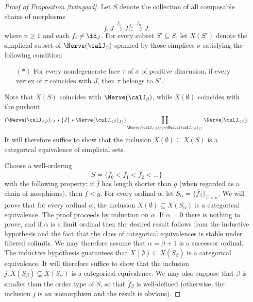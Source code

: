 \begin{Model Categories}
\begin{Didn't Read}
\begin{proof}[Proof of Proposition \ref{twingood}]
Let $S$ denote the collection of all composable chains of morphisms
$$\overline{f}: J \stackrel{ f_1}{\rightarrow} J \stackrel{ f_2} \ldots \stackrel{f_n}{\rightarrow} J.$$
where $n \geq 1$ and each $f_{i} \neq \id_{J}$. For every subset $S' \subseteq S$, let
$X(S')$ denote the simplicial subset of $\Nerve( \calJ_{\beta})$ spanned by those simplices
$\sigma$ satisfying the following condition:
\begin{itemize}
\item[$(\ast)$] For every nondegenerate face $\tau$ of $\sigma$ of positive dimension, if every
vertex of $\tau$ coincides with $J$, then $\tau$ belongs to $S'$.
\end{itemize}
Note that $X(S)$ coincides with $\Nerve( \calJ_{\beta})$, while $X( \emptyset)$ coincides with
the pushout 
$$(\Nerve (\calJ_{< \beta})_{/J} \star \{ J \} \star \Nerve (\calJ_{< \beta})_{J/})
\coprod_{ \Nerve( \calJ_{< \beta})_{/J} \star \Nerve( \calJ_{< \beta})_{J/}}
\Nerve( \calJ_{< \beta} ). $$
It will therefore suffice to show that the inclusion $X(\emptyset) \subseteq X(S)$ is a
categorical equivalence of simplicial sets.

Choose a well-ordering
$$ S = \{ \overline{f}_0 < \overline{f}_1 < \overline{f}_2 < \ldots \}$$
with the following property: if $\overline{f}$ has length shorter than $\overline{g}$
(when regarded as a chain of morphisms), then $\overline{f} < \overline{g}$.
For every ordinal $\alpha$, let $S_{\alpha} = \{ \overline{f}_{\beta} \}_{\beta < \alpha}$.
We will prove that for every ordinal $\alpha$, the inclusion
$X( \emptyset) \subseteq X( S_{\alpha})$ is a categorical equivalence.
The proof proceeds by induction on $\alpha$. If $\alpha = 0$ there is nothing to prove, and
if $\alpha$ is a limit ordinal then the desired result follows from the inductive hypothesis and the fact that the class of categorical equivalences is stable under filtered colimits. We may therefore assume that
$\alpha = \beta + 1$ is a successor ordinal. The inductive hypothesis guarantees that
$X(\emptyset) \subseteq X( S_{\beta})$ is a categorical equivalence. It will therefore suffice to show that
the inclusion $j: X( S_{\beta} ) \subseteq X( S_{\alpha})$ is a categorical equivalence.
We may also suppose that $\beta$ is smaller than the order type of $S$, so that
$\overline{f}_{\beta}$ is well-defined (otherwise, the inclusion $j$ is an isomorphism and the result is obvious). 


\end{proof}
\end{Didn't Read}
\end{Model Categories}

